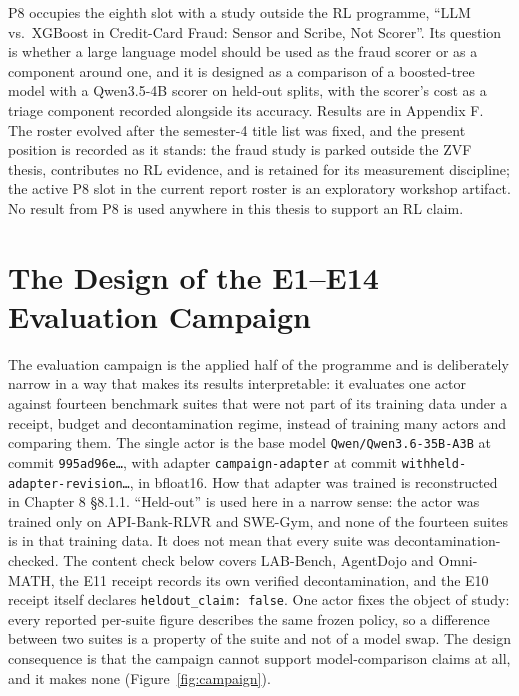 \documentclass[12pt,a4paper]{report}
\begin{document}
P8 occupies the eighth slot with a study outside the RL programme, ``LLM
vs.~XGBoost in Credit-Card Fraud: Sensor and Scribe, Not Scorer''. Its
question is whether a large language model should be used as the fraud
scorer or as a component around one, and it is designed as a comparison
of a boosted-tree model with a Qwen3.5-4B scorer on held-out splits,
with the scorer's cost as a triage component recorded alongside its
accuracy. Results are in Appendix F. The roster evolved after the
semester-4 title list was fixed, and the present position is recorded as
it stands: the fraud study is parked outside the ZVF thesis, contributes
no RL evidence, and is retained for its measurement discipline; the
active P8 slot in the current report roster is an exploratory workshop
artifact. No result from P8 is used anywhere in this thesis to support
an RL claim.

\section{The Design of the E1--E14 Evaluation
Campaign}\label{the-design-of-the-e1e14-evaluation-campaign}

The evaluation campaign is the applied half of the programme and is
deliberately narrow in a way that makes its results interpretable: it
evaluates one actor against fourteen benchmark suites that were not part
of its training data under a receipt, budget and decontamination regime,
instead of training many actors and comparing them. The single actor is
the base model \texttt{Qwen/Qwen3.6-35B-A3B} at commit
\texttt{995ad96e…}, with adapter \texttt{campaign-adapter} at commit
\texttt{withheld-adapter-revision…}, in bfloat16. How that adapter was
trained is reconstructed in Chapter 8 §8.1.1. ``Held-out'' is used here
in a narrow sense: the actor was trained only on API-Bank-RLVR and
SWE-Gym, and none of the fourteen suites is in that training data. It
does not mean that every suite was decontamination-checked. The content
check below covers LAB-Bench, AgentDojo and Omni-MATH, the E11 receipt
records its own verified decontamination, and the E10 receipt itself
declares \texttt{heldout\_claim:\ false}. One actor fixes the object of
study: every reported per-suite figure describes the same frozen policy,
so a difference between two suites is a property of the suite and not of
a model swap. The design consequence is that the campaign cannot support
model-comparison claims at all, and it makes none (Figure~\ref{fig:campaign}).
\end{document}
